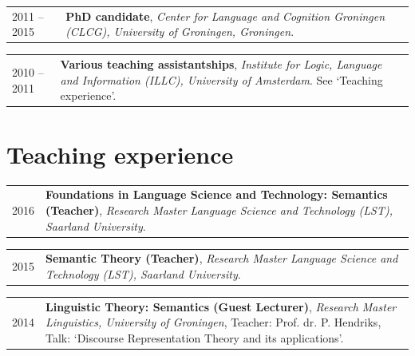 \documentclass[a4paper,10pt]{article}
\def\leftcolwidth{.12\textwidth}
\def\tablevspace{10pt}
\begin{document}
\noindent
\begin{tabularx}{\textwidth}{ p{\leftcolwidth} X }
  2011 -- 2015 %
  & \textbf{PhD candidate}, \textit{Center for Language and Cognition
      Groningen (CLCG), University of Groningen, Groningen}.\\
\end{tabularx}

\vspace{\tablevspace}

\noindent
\begin{tabularx}{\textwidth}{ p{\leftcolwidth} X }
  2010 -- 2011
  & \textbf{Various teaching assistantships}, \textit{Institute for Logic,
      Language and Information (ILLC), University of Amsterdam}. See
      `Teaching experience'.\\
\end{tabularx}


\section*{Teaching experience}


\noindent
\begin{tabularx}{\textwidth}{ p{\leftcolwidth} X }
  2016
  & \textbf{Foundations in Language Science and Technology: Semantics (Teacher)},
  \textit{Research Master Language
  Science and Technology (LST), Saarland University}.\\
\end{tabularx}

\vspace{\tablevspace}

\noindent
\begin{tabularx}{\textwidth}{ p{\leftcolwidth} X }
  2015
  & \textbf{Semantic Theory (Teacher)}, \textit{Research Master Language
  Science and Technology (LST), Saarland University}.\\
\end{tabularx}

\vspace{\tablevspace}

\noindent
\begin{tabularx}{\textwidth}{ p{\leftcolwidth} X }
  2014
  & \textbf{Linguistic Theory: Semantics (Guest Lecturer)}, 
    \textit{Research Master Linguistics, University of Groningen},
    Teacher: Prof. dr. P. Hendriks,
    Talk: `Discourse Representation Theory and its applications'.
\end{tabularx}
\end{document}
